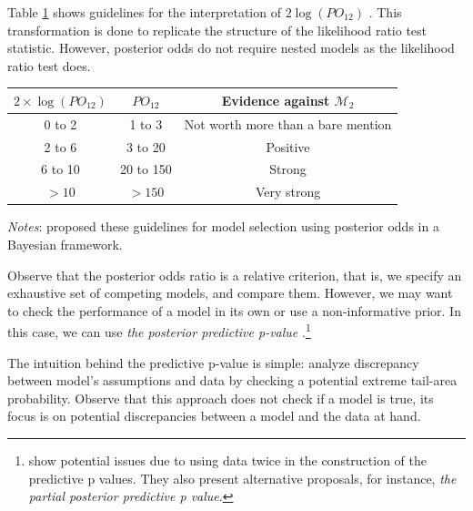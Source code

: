 Table \ref{tab:guide} shows guidelines for the interpretation of $2\log(PO_{12})$ \cite{Kass1995}. This transformation is done to replicate the structure of the likelihood ratio test statistic. However, posterior odds do not require nested models as the likelihood ratio test does.
\begin{table}%
	\label{tab:guide}%
	\begin{tabular}{ccc}
		\textbf{$2\times\log(PO_{12})$}    & \textbf{$PO_{12}$} & \textbf{Evidence against $\mathcal{M}_2$} \\
		\hline
		0 to 2 & 1 to 3 & Not worth more than a bare mention\\
		2 to 6 & 3 to 20 & Positive\\
		6 to 10 & 20 to 150 & Strong\\
		$> 10$  & $> 150$ & Very strong\\
	\end{tabular}
				\begin{tablenotes}
	\footnotesize \textit{Notes}: \cite{Kass1995} proposed these guidelines for model selection using posterior odds in a Bayesian framework.\\
\end{tablenotes}
\end{table}
Observe that the posterior odds ratio is a relative criterion, that is, we specify an exhaustive set of competing models, and compare them. However, we may want to check the performance of a model in its own or use a non-informative prior. In this case, we can use \textit{the posterior predictive p-value} \cite{Gelman1996,gelman1996posterior}.\footnote{\cite{Bayarri2000} show potential issues due to using data twice in the construction of the predictive p values. They also present alternative proposals, for instance, \textit{the partial posterior predictive p value}.}

The intuition behind the predictive p-value is simple: analyze discrepancy between model's assumptions and data by checking a potential extreme tail-area probability. Observe that this approach does not check if a model is true, its focus is on potential discrepancies between a model and the data at hand. 

